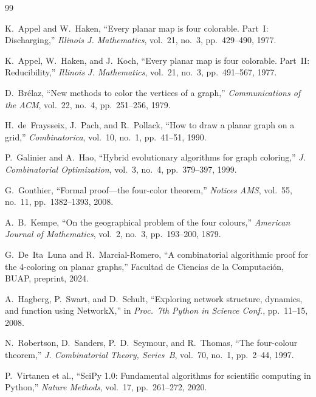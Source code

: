\documentclass[11pt,twocolumn]{article}
\begin{document}
\begin{thebibliography}{99}

K.~Appel and W.~Haken,
``Every planar map is four colorable. Part~I: Discharging,''
\textit{Illinois J. Mathematics}, vol.~21, no.~3, pp.~429--490, 1977.

K.~Appel, W.~Haken, and J.~Koch,
``Every planar map is four colorable. Part~II: Reducibility,''
\textit{Illinois J. Mathematics}, vol.~21, no.~3, pp.~491--567, 1977.

D.~Br\'elaz,
``New methods to color the vertices of a graph,''
\textit{Communications of the ACM}, vol.~22, no.~4, pp.~251--256, 1979.

H.~de~Fraysseix, J.~Pach, and R.~Pollack,
``How to draw a planar graph on a grid,''
\textit{Combinatorica}, vol.~10, no.~1, pp.~41--51, 1990.

P.~Galinier and A.~Hao,
``Hybrid evolutionary algorithms for graph coloring,''
\textit{J. Combinatorial Optimization}, vol.~3, no.~4, pp.~379--397, 1999.

G.~Gonthier,
``Formal proof---the four-color theorem,''
\textit{Notices AMS}, vol.~55, no.~11, pp.~1382--1393, 2008.

A.~B.~Kempe,
``On the geographical problem of the four colours,''
\textit{American Journal of Mathematics}, vol.~2, no.~3, pp.~193--200, 1879.

G.~De~Ita~Luna and R.~Marcial-Romero,
``A combinatorial algorithmic proof for the 4-coloring on planar graphs,''
Facultad de Ciencias de la Computaci\'on, BUAP, preprint, 2024.

A.~Hagberg, P.~Swart, and D.~Schult,
``Exploring network structure, dynamics, and function using NetworkX,''
in \textit{Proc.\ 7th Python in Science Conf.}, pp.~11--15, 2008.

N.~Robertson, D.~Sanders, P.~D.~Seymour, and R.~Thomas,
``The four-colour theorem,''
\textit{J. Combinatorial Theory, Series~B}, vol.~70, no.~1, pp.~2--44, 1997.

P.~Virtanen et al.,
``SciPy 1.0: Fundamental algorithms for scientific computing in Python,''
\textit{Nature Methods}, vol.~17, pp.~261--272, 2020.

\end{thebibliography}
\end{document}
